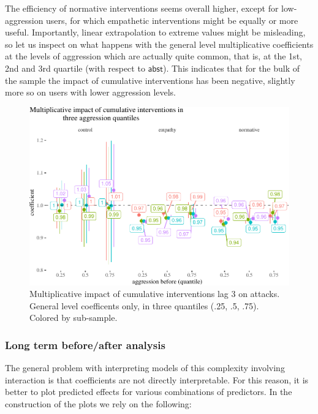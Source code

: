 \documentclass[preprint,12pt]{elsarticle}
\begin{document}
\normalsize

The efficiency of normative interventions seems overall higher, except
for low-aggression users, for which empathetic interventions might be
equally or more useful. Importantly, linear extrapolation to extreme
values might be misleading, so let us inspect on what happens with the
general level multiplicative coefficients at the levels of aggression
which are actually quite common, that is, at the 1st, 2nd and 3rd
quartile (with respect to \(\mathsf{abst}\)). This indicates that for
the bulk of the sample the impact of cumulative interventions has been
negative, slightly more so on users with lower aggression levels.






\begin{figure}

\begin{center}\includegraphics[width=1\linewidth]{ figures/fig:cumulativeResultsGeenralPlot-1} \end{center}
\caption{Multiplicative impact of cumulative interventions lag 3 on attacks. General level coefficents only, in three quantiles (.25, .5, .75). Colored by sub-sample.}
\label{fig:cumulativeResultsGeneralPlot}
\end{figure}


\subsubsection{Long term before/after
analysis}\label{subsubsec:long-term-beforeafter-analysis}

The general problem with interpreting  models of this complexity involving
interaction is  that coefficients are not directly interpretable. For this reason, it is better
to plot predicted effects for various combinations of predictors. In the
construction of the plots we rely on the following:
\end{document}
